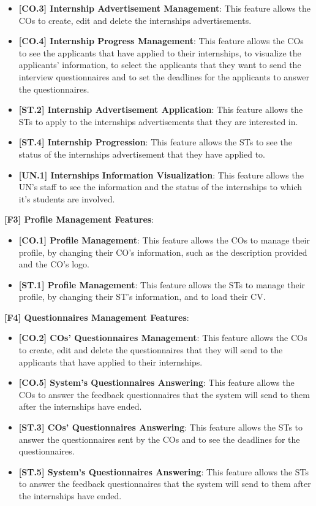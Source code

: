 \begin{itemize}
    \item \textbf{[CO.3] Internship Advertisement Management}: This feature allows the COs to create, edit and delete
    the internships advertisements.
    \item \textbf{[CO.4] Internship Progress Management}: This feature allows the COs to see the applicants that have
    applied to their internships, to visualize the applicants' information, to select the applicants that they want to
    send the interview questionnaires and to set the deadlines for the applicants to answer the questionnaires.
    \item \textbf{[ST.2] Internship Advertisement Application}: This feature allows the STs to apply to the internships
    advertisements that they are interested in.
    \item \textbf{[ST.4] Internship Progression}: This feature allows the STs to see the status of the internships
    advertisement that they have applied to.
    \item \textbf{[UN.1] Internships Information Visualization}: This feature allows the UN's staff to see the
    information and the status of the internships to which it's students are involved.
\end{itemize}


\par \textbf{[F3] Profile Management Features}:

\begin{itemize}
    \item \textbf{[CO.1] Profile Management}: This feature allows the COs to manage their profile, by changing their
    CO's information, such as the description provided and the CO's logo.
    \item \textbf{[ST.1] Profile Management}: This feature allows the STs to manage their profile, by changing their
    ST's information, and to load their CV.
\end{itemize}

\par \textbf{[F4] Questionnaires Management Features}:

\begin{itemize}
    \item \textbf{[CO.2] COs' Questionnaires Management}: This feature allows the COs to create, edit and delete the 
    questionnaires that they will send to the applicants that have applied to their internships.
    \item \textbf{[CO.5] System's Questionnaires Answering}: This feature allows the COs to answer the feedback 
    questionnaires that the system will send to them after the internships have ended.
    \item \textbf{[ST.3] COs' Questionnaires Answering}: This feature allows the STs to answer the questionnaires sent by
    the COs and to see the deadlines for the questionnaires.
    \item \textbf{[ST.5] System's Questionnaires Answering}: This feature allows the STs to answer the feedback 
    questionnaires that the system will send to them after the internships have ended.

\end{itemize} 

